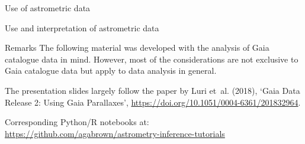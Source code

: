 \documentclass[smaller, aspectratio=169]{beamer}
\begin{document}
%
%
\begin{emptyframe}{Use of astrometric data}
  \begin{center}
    \textcolor{GaiaRed}{\Huge Use and interpretation of astrometric data}
  \end{center}
\end{emptyframe}
%
%
\begin{agaframe}{Remarks}
  The following material was developed with the analysis of Gaia catalogue data in mind. However,
  most of the considerations are not exclusive to Gaia catalogue data but apply to data analysis in
  general.

  \bigskip
  The presentation slides largely follow the paper by Luri et~al. (2018), `Gaia Data Release 2:
  Using Gaia Parallaxes', \url{https://doi.org/10.1051/0004-6361/201832964}.

  \bigskip
  Corresponding Python/R notebooks at:
  \url{https://github.com/agabrown/astrometry-inference-tutorials}
\end{agaframe}
%
%
\end{document}
